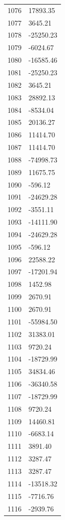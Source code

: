 \documentclass[a4paper,11pt]{article}
\begin{document}
\begin{center}
\begin{longtable}{|R{1.5cm}|R{2.5cm}|}
 1076 &     17893.35 \\
 1077 &      3645.21 \\
 1078 &    -25250.23 \\
 1079 &     -6024.67 \\
 1080 &    -16585.46 \\
 1081 &    -25250.23 \\
 1082 &      3645.21 \\
 1083 &     28892.13 \\
 1084 &     -8534.04 \\
 1085 &     20136.27 \\
 1086 &     11414.70 \\
 1087 &     11414.70 \\
 1088 &    -74998.73 \\
 1089 &     11675.75 \\
 1090 &      -596.12 \\
 1091 &    -24629.28 \\
 1092 &     -3551.11 \\
 1093 &    -14111.90 \\
 1094 &    -24629.28 \\
 1095 &      -596.12 \\
 1096 &     22588.22 \\
 1097 &    -17201.94 \\
 1098 &      1452.98 \\
 1099 &      2670.91 \\
 1100 &      2670.91 \\
 1101 &    -55984.50 \\
 1102 &     31383.01 \\
 1103 &      9720.24 \\
 1104 &    -18729.99 \\
 1105 &     34834.46 \\
 1106 &    -36340.58 \\
 1107 &    -18729.99 \\
 1108 &      9720.24 \\
 1109 &     14460.81 \\
 1110 &     -6683.14 \\
 1111 &      3891.40 \\
 1112 &      3287.47 \\
 1113 &      3287.47 \\
 1114 &    -13518.32 \\
 1115 &     -7716.76 \\
 1116 &     -2939.76 \\

\end{longtable}
\end{center}
\end{document}
